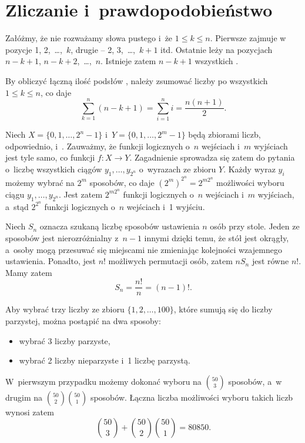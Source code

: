 \chapter{Zliczanie i~prawdopodobieństwo}


\exercise{} %
Załóżmy, że nie rozważamy słowa pustego i~że $1\le k\le n$. Pierwsze  zajmuje w~ pozycje 1, 2,~\dots,~$k$, drugie -- 2, 3,~\dots,~$k+1$ itd. Ostatnie  leży na pozycjach $n-k+1$, $n-k+2$,~\dots,~$n$. Istnieje zatem $n-k+1$ wszystkich  .

By obliczyć łączną ilość podsłów , należy zsumować liczby  po wszystkich $1\le k\le n$, co daje
\[
	\sum_{k=1}^n(n-k+1) = \sum_{i=1}^ni = \frac{n(n+1)}{2}.
\]

\exercise{} %
Niech $X=\{0,1,\dots,2^n-1\}$ i~$Y=\{0,1,\dots,2^m-1\}$ będą zbiorami liczb, odpowiednio,  i~. Zauważmy, że funkcji logicznych o~$n$ wejściach i~$m$ wyjściach jest tyle samo, co funkcji $f\colon X\to Y$. Zagadnienie sprowadza się zatem do pytania o~liczbę wszystkich ciągów $y_1,\dots,y_{2^n}$ o~wyrazach ze zbioru  $Y$. Każdy wyraz $y_i$ możemy wybrać na $2^m$ sposobów, co daje $(2^m)^{2^n} = 2^{m2^n}$ możliwości wyboru ciągu $y_1,\dots,y_{2^n}$. Jest zatem $2^{m2^n}$ funkcji logicznych o~$n$ wejściach i~$m$ wyjściach, a~stąd $2^{2^n}$ funkcji logicznych o~$n$ wejściach i~1 wyjściu.

\exercise{} %
Niech $S_n$ oznacza szukaną liczbę sposobów ustawienia $n$ osób przy stole. Jeden ze sposobów jest nierozróżnialny z~$n-1$ innymi dzięki temu, że stół jest okrągły, a~osoby mogą przesuwać się miejscami nie zmieniając kolejności wzajemnego ustawienia. Ponadto, jest $n!$ możliwych permutacji osób, zatem $nS_n$ jest równe $n!$. Mamy zatem
\[
	S_n = \frac{n!}{n} = (n-1)!.
\]

\exercise{} %
Aby wybrać trzy liczby ze zbioru $\{1,2,\dots,100\}$, które sumują się do liczby parzystej, można postąpić na dwa sposoby:
\begin{itemize}
	\item wybrać 3 liczby parzyste,
	\item wybrać 2 liczby nieparzyste i~1 liczbę parzystą.
\end{itemize}
W~pierwszym przypadku możemy dokonać wyboru na $\binom{50}{3}$ sposobów, a~w drugim na $\binom{50}{2}\binom{50}{1}$ sposobów. Łączna liczba możliwości wyboru takich liczb wynosi zatem
\[
	\binom{50}{3}+\binom{50}{2}\binom{50}{1} = 80850.
\]

